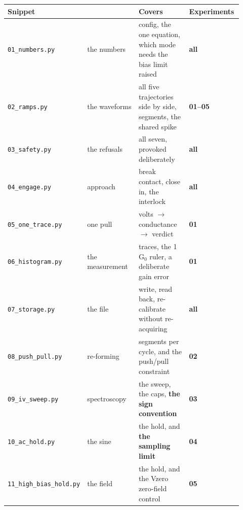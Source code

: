 \small\setlength{\LTleft}{0pt}\setlength{\LTright}{\fill}
\begin{longtable}{@{}>{\raggedright\arraybackslash}p{0.230\linewidth}>{\raggedright\arraybackslash}p{0.230\linewidth}>{\raggedright\arraybackslash}p{0.230\linewidth}>{\raggedright\arraybackslash}p{0.230\linewidth}@{}}
\toprule
\textbf{Snippet} & \textbf{} & \textbf{Covers} & \textbf{Experiments} \\
\midrule\endhead
\texttt{01\_\discretionary{}{}{}numbers.\discretionary{}{}{}py} & the numbers & config, the one equation, which mode needs the bias limit raised & \textbf{all} \\
\texttt{02\_\discretionary{}{}{}ramps.\discretionary{}{}{}py} & the waveforms & all five trajectories side by side, segments, the shared spike & \textbf{01--05} \\
\texttt{03\_\discretionary{}{}{}safety.\discretionary{}{}{}py} & the refusals & all seven, provoked deliberately & \textbf{all} \\
\texttt{04\_\discretionary{}{}{}engage.\discretionary{}{}{}py} & approach & break contact, close in, the interlock & \textbf{all} \\
\texttt{05\_\discretionary{}{}{}one\_\discretionary{}{}{}trace.\discretionary{}{}{}py} & one pull & volts $\rightarrow$ conductance $\rightarrow$ verdict & \textbf{01} \\
\texttt{06\_\discretionary{}{}{}histogram.\discretionary{}{}{}py} & the measurement & 200 traces, the 1 G$_0$ ruler, a deliberate gain error & \textbf{01} \\
\texttt{07\_\discretionary{}{}{}storage.\discretionary{}{}{}py} & the file & write, read back, re-calibrate without re-acquiring & \textbf{all} \\
\texttt{08\_\discretionary{}{}{}push\_\discretionary{}{}{}pull.\discretionary{}{}{}py} & re-forming & segments per cycle, and the push/pull constraint & \textbf{02} \\
\texttt{09\_\discretionary{}{}{}iv\_\discretionary{}{}{}sweep.\discretionary{}{}{}py} & spectroscopy & the sweep, the caps, \textbf{the sign convention} & \textbf{03} \\
\texttt{10\_\discretionary{}{}{}ac\_\discretionary{}{}{}hold.\discretionary{}{}{}py} & the sine & the hold, and \textbf{the sampling limit} & \textbf{04} \\
\texttt{11\_\discretionary{}{}{}high\_\discretionary{}{}{}bias\_\discretionary{}{}{}hold.\discretionary{}{}{}py} & the field & the hold, and the Vzero zero-field control & \textbf{05} \\

\end{longtable}
